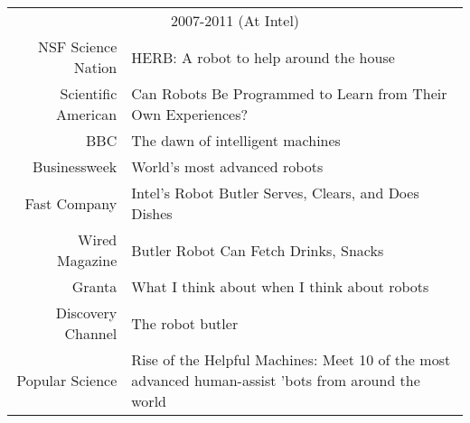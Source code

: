 \begin{tabularx}{\linewidth}{rX}
\multicolumn{2}{c}{2007-2011 (At Intel)}\\ 
NSF Science Nation & {HERB: A robot to help around the house}\\
Scientific American & {Can Robots Be Programmed to Learn from Their Own Experiences?}\\
BBC & {The dawn of intelligent machines}\\
Businessweek & {World's most advanced robots}\\
Fast Company & {Intel's Robot Butler Serves, Clears, and Does Dishes}\\
Wired Magazine & {Butler Robot Can Fetch Drinks, Snacks}\\
Granta & {What I think about when I think about robots}\\
Discovery Channel & {The robot butler}\\
Popular Science & {Rise of the Helpful Machines: Meet 10 of the most advanced human-assist 'bots from around the world}\\
\end{tabularx}
